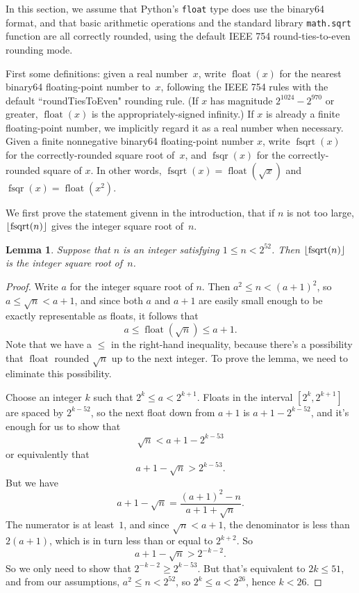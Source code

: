 \documentclass[a4paper]{article}
\DeclarePairedDelimiter\floor{\lfloor}{\rfloor}
\DeclareMathOperator{\fsqrt}{fsqrt}
\DeclareMathOperator{\fsqr}{fsqr}
\DeclareMathOperator{\float}{float}
\theoremstyle{plain}
\newtheorem{lemma}[theorem]{Lemma}
\theoremstyle{definition}
\begin{document}
In this section, we assume that Python's \lstinline{float} type does use
the binary64 format, and that basic arithmetic operations and the standard
library \lstinline{math.sqrt} function are all correctly rounded, using the
default IEEE 754 round-ties-to-even rounding mode.

First some definitions: given a real number~$x$, write $\float(x)$ for the
nearest binary64 floating-point number to~$x$, following the IEEE 754 rules
with the default ``roundTiesToEven" rounding rule. (If $x$ has magnitude
$2^{1024} - 2^{970}$ or greater, $\float(x)$ is the appropriately-signed
infinity.) If $x$ is already a finite floating-point number, we implicitly
regard it as a real number when necessary. Given a finite nonnegative
binary64 floating-point number $x$, write $\fsqrt(x)$ for the correctly-rounded
square root of~$x$, and $\fsqr(x)$ for the correctly-rounded square of $x$. In
other words, $\fsqrt(x) = \float(\sqrt x)$ and $\fsqr(x) = \float(x^2)$.

We first prove the statement givenn in the introduction, that if $n$ is
not too large, $\floor{\fsqrt(n)}$ gives the integer square root of~$n$.

\begin{lemma}
  Suppose that $n$ is an integer satisfying $1 \le n < 2^{52}$. Then
  $\floor{\fsqrt(n)}$ is the integer square root of~$n$.
\end{lemma}

\begin{proof}
  Write $a$ for the integer square root of $n$. Then $a^2 \le n < (a + 1)^2$,
  so $a \le \sqrt n < a + 1$, and since both $a$ and $a + 1$ are easily small
  enough to be exactly representable as floats, it follows that
  $$a \le \float(\sqrt n) \le a + 1.$$
  Note that we have a $\le$ in the right-hand inequality, because there's a
  possibility that $\float$ rounded $\sqrt n$ up to the next integer. To prove
  the lemma, we need to eliminate this possibility.

  Choose an integer $k$ such that $2^k \le a < 2^{k + 1}$. Floats in
  the interval $[2^k, 2^{k+1}]$ are spaced by $2^{k-52}$, so the next
  float down from $a + 1$ is $a + 1 - 2^{k - 52}$, and it's enough for
  us to show that
  $$\sqrt n < a + 1 - 2^{k-53}$$
  or equivalently that
  $$a + 1 - \sqrt n > 2^{k - 53}.$$
  But we have
  $$a + 1 - \sqrt n = \frac{(a + 1)^2 - n}{a + 1 + \sqrt n}.$$
  The numerator is at least~$1$, and since $\sqrt n < a + 1$, the denominator is less
  than $2(a+1)$, which is in turn less than or equal to $2^{k+2}$. So
  $$a + 1 - \sqrt n > 2^{-k-2}.$$
  So we only need to show that $2^{-k-2} \ge 2^{k-53}$. But that's equivalent
  to $2k \le 51$, and from our assumptions, $a^2 \le n < 2^{52}$, so
  $2^k \le a < 2^{26}$, hence $k < 26$.
\end{proof}
\end{document}

